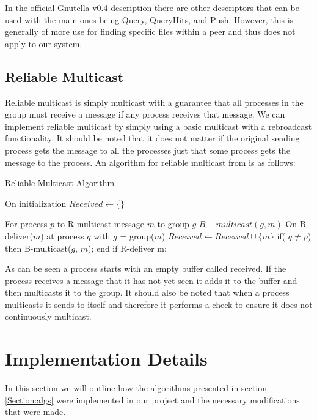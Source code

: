 \documentclass[10pt,letterpaper]{article}
\begin{document}
In the official Gnutella v0.4 description there are other descriptors that can be used with the main ones being Query, QueryHits, and Push. However, this is generally of more use for finding specific files within a peer and thus does not apply to our system.


\subsection{Reliable Multicast}
Reliable multicast is simply multicast with a guarantee that all processes in the group must receive a message if any process receives that message. We can implement reliable multicast by simply using a basic multicast with a rebroadcast functionality. It should be noted that it does not matter if the original sending process gets the message to all the processes just that some process gets the message to the process. An algorithm for reliable multicast from \cite{Coulouris5} is as follows:

\begin{algorithm}
\caption{Reliable Multicast Algorithm}\label{alg:multicast}
\begin{algorithmic}
\State On initialization
\Indent
    \State $Received \gets \{\}$
\EndIndent

\State For process $p$ to R-multicast message $m$ to group $g$
\Indent
\State $B-multicast(g,m)$ 
\EndIndent
\State On B-deliver($m$) at process $q$ with $g$ = group($m$)
\Indent
{}
    \State $Received \gets Received \cup \{m\}$
    \State if( $q \neq p$) then B-multicast($g$, $m$); end if
    \State R-deliver m;
\EndIf
\EndIndent
\end{algorithmic}
\end{algorithm}

As can be seen a process starts with an empty buffer called received. If the process receives a message that it has not yet seen it adds it to the buffer and then multicasts it to the group. It should also be noted that when a process multicasts it sends to itself and therefore it performs a check to ensure it does not continuously multicast.


\section{Implementation Details}
In this section we will outline how the algorithms presented in section \ref{Section:algs} were implemented in our project and the necessary modifications that were made.
\end{document}
